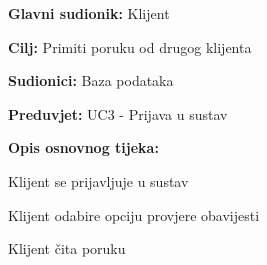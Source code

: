 					\noindent {}
					\begin{packed_item}
	
						\item \textbf{Glavni sudionik: } Klijent
						\item  \textbf{Cilj:} Primiti poruku od drugog klijenta 
						\item  \textbf{Sudionici:} Baza podataka
						\item  \textbf{Preduvjet:} UC3 - Prijava u sustav
						\item  \textbf{Opis osnovnog tijeka:}
						
						\item[] \begin{packed_enum}
							
							\item Klijent se prijavljuje u sustav
							\item Klijent odabire opciju provjere obavijesti
							\item Klijent čita poruku
						\end{packed_enum}
					\end{packed_item}

